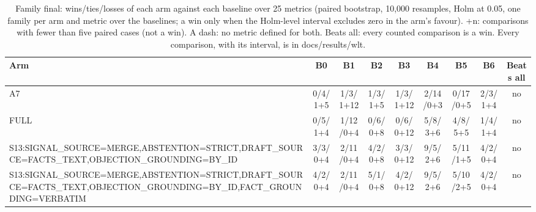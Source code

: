 \begin{table}[!t]
\centering\small
\begin{adjustbox}{max width=\textwidth}
\begin{tabular}{@{}lcccccccc@{}}
\toprule
Arm & B0 & B1 & B2 & B3 & B4 & B5 & B6 & Beats all \\
\midrule
A7 & 0/4/1+5 & 1/3/1+12 & 1/3/1+5 & 1/3/1+12 & 2/14/0+3 & 0/17/0+5 & 2/3/1+4 & no \\
FULL & 0/5/1+4 & 1/12/0+4 & 0/6/0+8 & 0/6/0+12 & 5/8/3+6 & 4/8/5+5 & 1/4/1+4 & no \\
S13:SIGNAL\_SOURCE=MERGE,ABSTENTION=STRICT,DRAFT\_SOURCE=FACTS\_TEXT,OBJECTION\_GROUNDING=BY\_ID & 3/3/0+4 & 2/11/0+4 & 4/2/0+8 & 3/3/0+12 & 9/5/2+6 & 5/11/1+5 & 4/2/0+4 & no \\
S13:SIGNAL\_SOURCE=MERGE,ABSTENTION=STRICT,DRAFT\_SOURCE=FACTS\_TEXT,OBJECTION\_GROUNDING=BY\_ID,FACT\_GROUNDING=VERBATIM & 4/2/0+4 & 2/11/0+4 & 5/1/0+8 & 4/2/0+12 & 9/5/2+6 & 5/10/2+5 & 4/2/0+4 & no \\
\bottomrule
\end{tabular}
\end{adjustbox}
\caption{Family final: wins/ties/losses of each arm against each baseline over 25 metrics (paired bootstrap, 10,000 resamples, Holm at 0.05, one family per arm and metric over the baselines; a win only when the Holm-level interval excludes zero in the arm's favour). +n: comparisons with fewer than five paired cases (not a win). A dash: no metric defined for both. Beats all: every counted comparison is a win. Every comparison, with its interval, is in docs/results/wlt.}
\label{tab:wlt_final}
\end{table}
